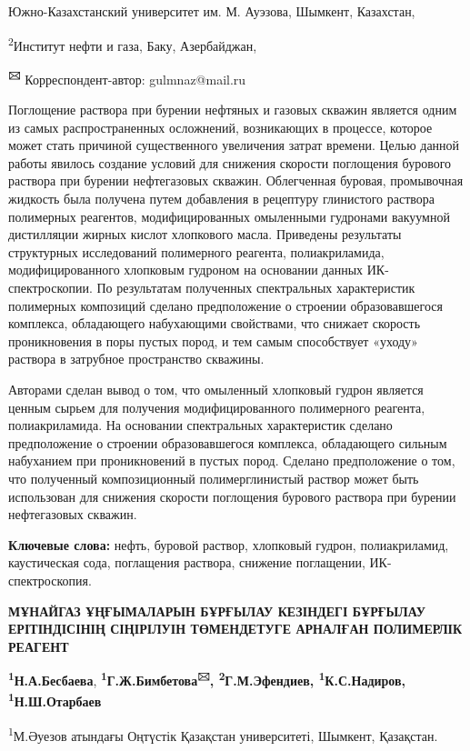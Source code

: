 Южно-Казахстанский университет им. М. Ауэзова, Шымкент, Казахстан,

\textsuperscript{2}Институт нефти и газа, Баку, Азербайджан,

{\bfseries \textsuperscript{🖂}} Корреспондент-автор: gulmnaz@mail.ru

Поглощение раствора при бурении нефтяных и газовых скважин является
одним из самых распространенных осложнений, возникающих в процессе,
которое может стать причиной существенного увеличения затрат времени.
Целью данной работы явилось создание условий для снижения скорости
поглощения бурового раствора при бурении нефтегазовых скважин.
Облегченная буровая, промывочная жидкость была получена путем добавления
в рецептуру глинистого раствора полимерных реагентов, модифицированных
омыленными гудронами вакуумной дистилляции жирных кислот хлопкового
масла. Приведены результаты структурных исследований полимерного
реагента, полиакриламида, модифицированного хлопковым гудроном на
основании данных ИК-спектроскопии. По результатам полученных
спектральных характеристик полимерных композиций сделано предположение о
строении образовавшегося комплекса, обладающего набухающими свойствами,
что снижает скорость проникновения в поры пустых пород, и тем самым
способствует «уходу» раствора в затрубное пространство скважины.

Авторами сделан вывод о том, что омыленный хлопковый гудрон является
ценным сырьем для получения модифицированного полимерного реагента,
полиакриламида. На основании спектральных характеристик сделано
предположение о строении образовавшегося комплекса, обладающего сильным
набуханием при проникновений в пустых пород. Сделано предположение о
том, что полученный композиционный полимерглинистый раствор может быть
использован для снижения скорости поглощения бурового раствора при
бурении нефтегазовых скважин.

{\bfseries Ключевые слова:} нефть, буровой раствор, хлопковый гудрон,
полиакриламид, каустическая сода, поглащения раствора, снижение
поглащении, ИК-спектроскопия.

{\bfseries МҰНАЙГАЗ ҰҢҒЫМАЛАРЫН БҰРҒЫЛАУ КЕЗІНДЕГІ БҰРҒЫЛАУ ЕРІТІНДІСІНІҢ
СІҢІРІЛУІН ТӨМЕНДЕТУГЕ АРНАЛҒАН ПОЛИМЕРЛІК РЕАГЕНТ}

{\bfseries \textsuperscript{1}Н.А.Бесбаева},
{\bfseries \textsuperscript{1}Г.Ж.Бимбетова\textsuperscript{🖂},
\textsuperscript{2}Г.М.Эфендиев, \textsuperscript{1}К.С.Надиров,
\textsuperscript{1}Н.Ш.Отарбаев}

\textsuperscript{1}М.Әуезов атындағы Оңтүстік Қазақстан университеті,
Шымкент, Қазақстан.

